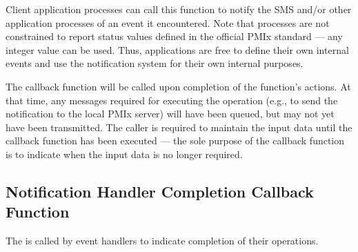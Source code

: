 Client application processes can call this function to notify the \ac{SMS} and/or other application processes of an event it encountered. Note that processes are not constrained to report status values defined in the official \ac{PMIx} standard --- any integer value can be used. Thus, applications are free to define their own internal events and use the notification system for their own internal purposes.

\adviceuserstart
The callback function will be called upon completion of the
 function's actions. At that time, any messages required for executing the operation (e.g., to send the notification to the local \ac{PMIx} server) will
have been queued, but may not yet have been transmitted. The caller is required to maintain the input
data until the callback function has been executed --- the sole purpose of the callback function is to indicate when the input data is no longer required.
\adviceuserend

\subsection{Notification Handler Completion Callback Function}

\summary

The  is called by event handlers to indicate completion of their operations.


\begin{arglist}
\end{arglist}

